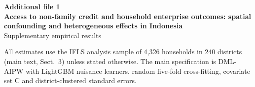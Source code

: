 \documentclass[11pt]{article}
\begin{document}
\noindent\textbf{Additional file 1}\\[2pt]
\textbf{Access to non-family credit and household enterprise outcomes: spatial confounding and heterogeneous effects in Indonesia}\\[2pt]
Supplementary empirical results
\bigskip

\noindent All estimates use the IFLS analysis sample of 4,326 households in 240 districts (main text, Sect.~3) unless stated otherwise. The main specification is DML-AIPW with LightGBM nuisance learners, random five-fold cross-fitting, covariate set C and district-clustered standard errors. 


\end{document}
